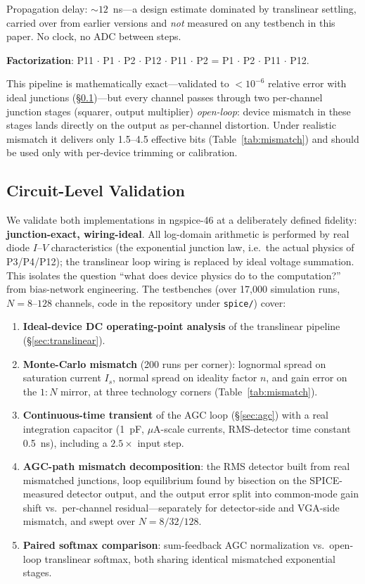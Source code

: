 \documentclass[11pt]{article}
\begin{document}
Propagation delay: ${\sim}12$~ns---a design estimate dominated by translinear settling, carried over from earlier versions and \textit{not} measured on any testbench in this paper. No clock, no ADC between steps.

\textbf{Factorization}: P11 $\cdot$ P1 $\cdot$ P2 $\cdot$ P12 $\cdot$ P11 $\cdot$ P2 = P1 $\cdot$ P2 $\cdot$ P11 $\cdot$ P12.

This pipeline is mathematically exact---validated to $<\!10^{-6}$ relative error with ideal junctions (\S\ref{sec:validation})---but every channel passes through two per-channel junction stages (squarer, output multiplier) \textit{open-loop}: device mismatch in these stages lands directly on the output as per-channel distortion. Under realistic mismatch it delivers only 1.5--4.5 effective bits (Table~\ref{tab:mismatch}) and should be used only with per-device trimming or calibration.

\subsection{Circuit-Level Validation}
\label{sec:validation}

We validate both implementations in ngspice-46 at a deliberately defined fidelity: \textbf{junction-exact, wiring-ideal}. All log-domain arithmetic is performed by real diode $I$--$V$ characteristics (the exponential junction law, i.e.\ the actual physics of P3/P4/P12); the translinear loop wiring is replaced by ideal voltage summation. This isolates the question ``what does device physics do to the computation?'' from bias-network engineering. The testbenches (over 17{,}000 simulation runs, $N=8$--$128$ channels, code in the repository under \texttt{spice/}) cover:

\begin{enumerate}[leftmargin=*]
\item \textbf{Ideal-device DC operating-point analysis} of the translinear pipeline (\S\ref{sec:translinear}).
\item \textbf{Monte-Carlo mismatch} (200 runs per corner): lognormal spread on saturation current $I_s$, normal spread on ideality factor $n$, and gain error on the $1{:}N$ mirror, at three technology corners (Table~\ref{tab:mismatch}).
\item \textbf{Continuous-time transient} of the AGC loop (\S\ref{sec:agc}) with a real integration capacitor (1~pF, $\mu$A-scale currents, RMS-detector time constant 0.5~ns), including a $2.5\times$ input step.
\item \textbf{AGC-path mismatch decomposition}: the RMS detector built from real mismatched junctions, loop equilibrium found by bisection on the SPICE-measured detector output, and the output error split into common-mode gain shift vs.\ per-channel residual---separately for detector-side and VGA-side mismatch, and swept over $N=8/32/128$.
\item \textbf{Paired softmax comparison}: sum-feedback AGC normalization vs.\ open-loop translinear softmax, both sharing identical mismatched exponential stages.
\end{enumerate}
\end{document}
